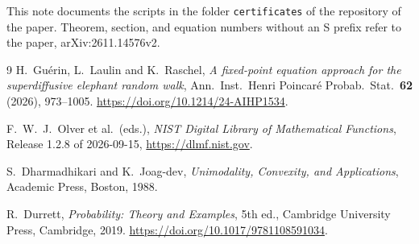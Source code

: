 \documentclass[EJP,preprint]{ejpecp}
\begin{document}
\raggedbottom
This note documents the scripts in the folder \texttt{certificates} of the
repository of the paper. Theorem, section, and equation numbers without an S
prefix refer to the paper, arXiv:2611.14576v2.



\begin{thebibliography}{9}
H.~Gu\'erin, L.~Laulin and K.~Raschel, \emph{A fixed-point equation approach
for the superdiffusive elephant random walk}, Ann.\ Inst.\ Henri Poincar\'e
Probab.\ Stat.\ \textbf{62} (2026), 973--1005.
\url{https://doi.org/10.1214/24-AIHP1534}.

F.~W.~J.~Olver et al.\ (eds.), \emph{NIST Digital Library of Mathematical
Functions}, Release 1.2.8 of 2026-09-15, \url{https://dlmf.nist.gov}.

S.~Dharmadhikari and K.~Joag-dev, \emph{Unimodality, Convexity, and
Applications}, Academic Press, Boston, 1988.

R.~Durrett, \emph{Probability: Theory and Examples}, 5th ed., Cambridge University
Press, Cambridge, 2019.
\url{https://doi.org/10.1017/9781108591034}.

\end{thebibliography}
\end{document}
